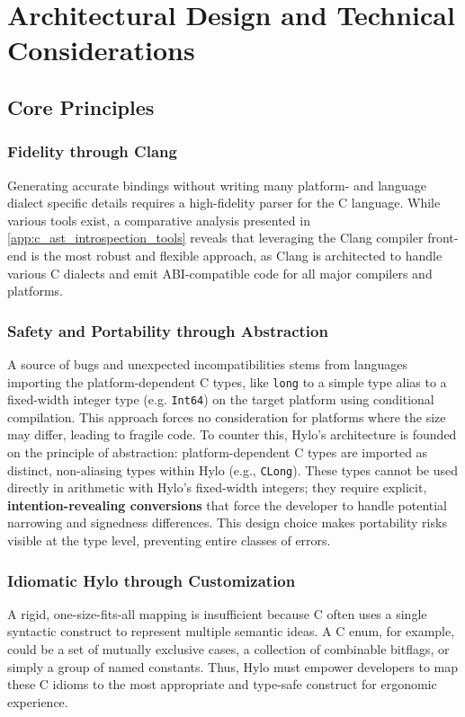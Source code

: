 \section{Architectural Design and Technical Considerations}
\label{sec:architectural_design}
\subsection{Core Principles}


\subsubsection{Fidelity through Clang}
Generating accurate bindings without writing many platform- and language dialect specific details requires a high-fidelity parser for the C language. While various tools exist, a comparative analysis presented in \autoref{app:c_ast_introspection_tools} reveals that leveraging the Clang compiler front-end is the most robust and flexible approach, as Clang is architected to handle various C dialects and emit ABI-compatible code for all major compilers and platforms.

\subsubsection{Safety and Portability through Abstraction}
A source of bugs and unexpected incompatibilities stems from languages importing the platform-dependent C types, like \texttt{long} to a simple type alias to a fixed-width integer type (e.g. \texttt{Int64}) on the target platform using conditional compilation. This approach forces no consideration for platforms where the size may differ, leading to fragile code. To counter this, Hylo's architecture is founded on the principle of abstraction: platform-dependent C types are imported as distinct, non-aliasing types within Hylo (e.g., \texttt{CLong}). These types cannot be used directly in arithmetic with Hylo's fixed-width integers; they require explicit, \textbf{intention-revealing conversions} that force the developer to handle potential narrowing and signedness differences. This design choice makes portability risks visible at the type level, preventing entire classes of errors.

\subsubsection{Idiomatic Hylo through Customization}
A rigid, one-size-fits-all mapping is insufficient because C often uses a single syntactic construct to represent multiple semantic ideas. A C enum, for example, could be a set of mutually exclusive cases, a collection of combinable bitflags, or simply a group of named constants. Thus, Hylo must empower developers to map these C idioms to the most appropriate and type-safe construct for ergonomic experience.

